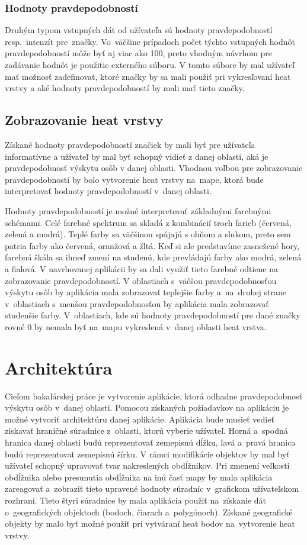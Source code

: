 \subsubsection{Hodnoty pravdepodobností}
Druhým typom vstupných dát od užívateľa sú hodnoty pravdepodobností resp.~intenzít pre~značky. Vo~väčšine prípadoch počet týchto vstupných hodnôt pravdepodobností môže byť aj viac ako 100, preto vhodným návrhom pre zadávanie hodnôt je použitie externého súboru. V tomto súbore by mal užívateľ mať možnosť zadefinovať, ktoré značky by sa mali použiť pri vykresľovaní heat vrstvy a aké hodnoty pravdepodobností by mali mať tieto značky.

\subsection{Zobrazovanie heat vrstvy}
Získané hodnoty pravdepodobností značiek by mali byť pre užívateľa informatívne a užívateľ by mal byť schopný vidieť z danej oblasti, aká je pravdepodobnosť výskytu osôb v danej oblasti. Vhodnou voľbou pre zobrazovanie pravdepodobností by bolo vytvorenie heat vrstvy na~mape, ktorá bude interpretovať hodnoty pravdepodobností v~danej oblasti.

Hodnoty pravdepodobností je možné interpretovať základnými farebnými schémami. Celé farebné spektrum sa skladá z kombinácií troch farieb (červená, zelená a modrá). Teplé farby sa väčšinou spájajú s ohňom a slnkom, preto sem patria farby ako červená, oranžová a žltá. Keď si ale predstavíme zasnežené hory, farebná škála sa ihneď zmení na studenú, kde prevládajú farby ako modrá, zelená a fialová. V navrhovanej aplikácii by sa dali využiť tieto farebné odtiene na zobrazovanie pravdepodobností. V oblastiach s~väčšou pravdepodobnosťou výskytu osôb by aplikácia mala zobrazovať teplejšie farby a~na~druhej strane v~oblastiach s~menšou pravdepodobnosťou by aplikácia mala zobrazovať studenšie farby. V~oblastiach, kde sú hodnoty pravdepodobností pre dané značky rovné $0$ by nemala byť na~mapu vykreslená v~danej oblasti heat vrstva.


\section{Architektúra}
Cieľom bakalárskej práce je vytvorenie aplikácie, ktorá odhadne pravdepodobnosť výskytu osôb v~danej oblasti. Pomocou získaných požiadavkov na aplikáciu je možné vytvoriť architektúru danej aplikácie. Aplikácia bude musieť vedieť získavať hraničné súradnice z~oblasti, ktorú vyberie užívateľ. Horná a~spodná hranica  danej oblasti budú reprezentovať zemepisnú dĺžku, ľavá a~pravá hranica budú reprezentovať zemepisnú šírku. V rámci modifikácie objektov by mal byť užívateľ schopný upravovať tvar nakreslených obdĺžnikov. Pri zmenení veľkosti obdĺžnika alebo presunutia obdĺžnika na inú časť mapy by mala aplikácia zareagovať a~zobraziť tieto upravené hodnoty súradníc v~grafickom užívateľskom rozhraní. Tieto štyri súradnice by mala aplikácia použiť na~získanie dát o~geografických objektoch (bodoch, čiarach a~polygónoch). Získané geografické objekty by malo byť možné použiť pri vytváraní heat bodov na~vytvorenie heat vrstvy. 



